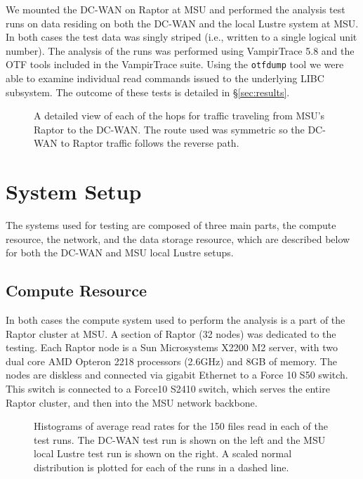 \documentclass[]{sig-alternate}
\begin{document}
We mounted the DC-WAN on Raptor at MSU and performed the analysis test runs on data residing on both the DC-WAN and the local Lustre system at MSU. In both cases the test data was singly striped (i.e., written to a single logical unit number). The analysis of the runs was performed using VampirTrace 5.8 and the OTF tools included in the VampirTrace suite. Using the {\tt otfdump} tool we were able to examine individual read commands issued to the underlying LIBC subsystem. The outcome of these tests is detailed in \S\ref{sec:results}.  

\begin{figure}[t]
\centering
{}
\caption{A detailed view of each of the hops for traffic traveling from MSU's Raptor to the DC-WAN. The route used was symmetric so the DC-WAN to Raptor traffic follows the reverse path.}
\label{fig:network}
\end{figure} 

\section{System Setup}\label{sec:setup}
The systems used for testing are composed of three main parts, the compute resource, the network, and the data storage resource, which are described below for both the DC-WAN and MSU local Lustre setups.

\subsection{Compute Resource}
In both cases the compute system used to perform the analysis is a part of the Raptor cluster at MSU. A section of Raptor (32 nodes) was dedicated to the testing.   Each Raptor node is a Sun Microsystems X2200 M2 server, with two dual core AMD Opteron 2218 processors (2.6GHz) and 8GB of memory.  The nodes are diskless and connected via gigabit Ethernet to a Force 10 S50 switch.  This switch is connected to a Force10 S2410 switch, which serves the entire Raptor cluster, and then into the MSU network backbone.

\begin{figure*}[t]
\centering
{}
\caption{Histograms of average read rates for the 150 files read in each of the test runs. The DC-WAN test run is shown on the left and the MSU local Lustre test run is shown on the right. A scaled normal distribution is plotted for each of the runs in a dashed line.}
\label{fig:hist}
\end{figure*}
\end{document}
